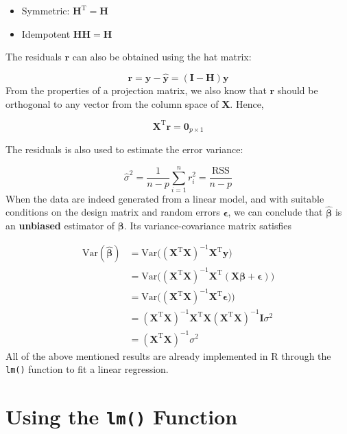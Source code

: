 \documentclass[
]{book}
\providecommand{\tightlist}{%
  \setlength{\itemsep}{0pt}\setlength{\parskip}{0pt}}
\theoremstyle{definition}
\theoremstyle{definition}
\theoremstyle{definition}
\theoremstyle{definition}
\theoremstyle{remark}
\begin{document}
\begin{itemize}
\tightlist
\item
  Symmetric: \(\mathbf{H}^\text{T}= \mathbf{H}\)
\item
  Idempotent \(\mathbf{H}\mathbf{H}= \mathbf{H}\)
\end{itemize}

The residuals \(\mathbf{r}\) can also be obtained using the hat matrix:

\[ \mathbf{r}= \mathbf{y}- \widehat{\mathbf{y}} = (\mathbf{I}- \mathbf{H}) \mathbf{y}\]
From the properties of a projection matrix, we also know that \(\mathbf{r}\) should be orthogonal to any vector from the column space of \(\mathbf{X}\). Hence,

\[\mathbf{X}^\text{T}\mathbf{r}= \mathbf{0}_{p \times 1}\]

The residuals is also used to estimate the error variance:

\[\widehat\sigma^2 = \frac{1}{n-p} \sum_{i=1}^n r_i^2 = \frac{\text{RSS}}{n-p}\]
When the data are indeed generated from a linear model, and with suitable conditions on the design matrix and random errors \(\boldsymbol \epsilon\), we can conclude that \(\widehat{\boldsymbol \beta}\) is an \textbf{unbiased} estimator of \(\boldsymbol \beta\). Its variance-covariance matrix satisfies

\[
\begin{align}
    \text{Var}(\widehat{\boldsymbol \beta}) &= \text{Var}\big( (\mathbf{X}^\text{T}\mathbf{X})^{-1}\mathbf{X}^\text{T}\mathbf{y}\big) \nonumber \\
    &= \text{Var}\big( (\mathbf{X}^\text{T}\mathbf{X})^{-1}\mathbf{X}^\text{T}(\mathbf{X}\boldsymbol \beta+ \boldsymbol \epsilon) \big) \nonumber \\
    &= \text{Var}\big( (\mathbf{X}^\text{T}\mathbf{X})^{-1}\mathbf{X}^\text{T}\boldsymbol \epsilon) \big) \nonumber \\
    &= (\mathbf{X}^\text{T}\mathbf{X})^{-1}\mathbf{X}^\text{T}\mathbf{X}(\mathbf{X}^\text{T}\mathbf{X})^{-1} \mathbf{I}\sigma^2 \nonumber \\
    &= (\mathbf{X}^\text{T}\mathbf{X})^{-1}\sigma^2
\end{align}
\]
All of the above mentioned results are already implemented in R through the \texttt{lm()} function to fit a linear regression.

\hypertarget{using-the-lm-function}{%
\section{\texorpdfstring{Using the \texttt{lm()} Function}{Using the lm() Function}}\label{using-the-lm-function}}
\end{document}
